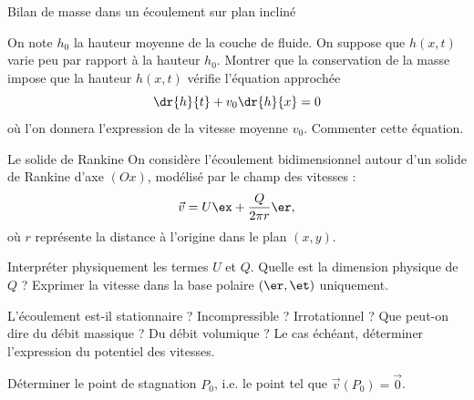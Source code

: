 \begin{exo}[PC][3]{Bilan de masse dans un écoulement sur plan incliné}
\begin{quest}
\item On note $h_0$ la hauteur moyenne de la couche de fluide. On suppose que $h(x,t)$ varie peu par rapport à la hauteur $h_0$. Montrer que la conservation de la masse impose que la hauteur $h(x,t)$
vérifie l'équation approchée
$$
	\dr{h}{t} + v_0 \dr{h}{x} = 0
$$
où l'on donnera l'expression de la vitesse moyenne $v_0$. Commenter cette équation.
\end{quest}

\end{exo}

\begin{exo}[PC][1][colle]{Le solide de Rankine}
On considère l'écoulement bidimensionnel autour d'un solide de Rankine d’axe $(Ox)$, modélisé par le champ des vitesses :
$$
\Vec{v} = U \ex + \frac{Q}{2\pi r}\er,
$$
où $r$ représente la distance à l’origine dans le plan $(x,y)$. 
\begin{quest}
	\item	Interpréter physiquement les termes $U$ et $Q$. Quelle est la dimension physique de $Q$ ? Exprimer la vitesse dans la base polaire $(\er,\et)$ uniquement.
	\item L'écoulement est-il stationnaire ? Incompressible ? Irrotationnel ? Que peut-on dire du débit massique ? Du débit volumique ? Le cas échéant, déterminer l'expression du potentiel des vitesses. 
	\item Déterminer le point de stagnation $P_0$, i.e. le point tel que $\Vec{v}(P_0) = \Vec{0}$.
\end{quest}
\end{exo}

